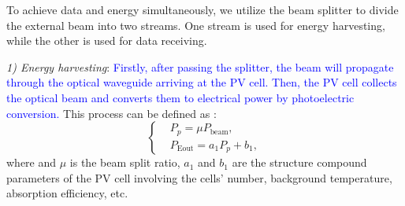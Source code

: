 \documentclass{IEEEtran}
\begin{document}

To achieve data and energy simultaneously, we utilize the beam splitter to divide the external beam into two streams. One stream is used for energy harvesting, while the other is used for data receiving. 

\emph{1) Energy harvesting}:
\textcolor{blue}{Firstly, after passing the splitter, the beam will propagate through the optical waveguide arriving at the PV cell. 
Then, the PV cell collects the optical beam and converts them to electrical power by photoelectric conversion. }
This process can be defined as \cite{zhang2018adaptive}:
\begin{equation}\label{PV}
\left\{
\begin{aligned}
&P_{p}=\mu P_\mathrm{beam},\\
&P_\mathrm{Eout}=a_1 P_{p}+b_1,
\end{aligned}
\right.
\end{equation}
where and $\mu$ is the beam split ratio, $a_1$ and $b_1$ are the structure compound parameters of the PV cell involving the cells' number, background temperature, absorption efficiency, etc. %
\end{document}
